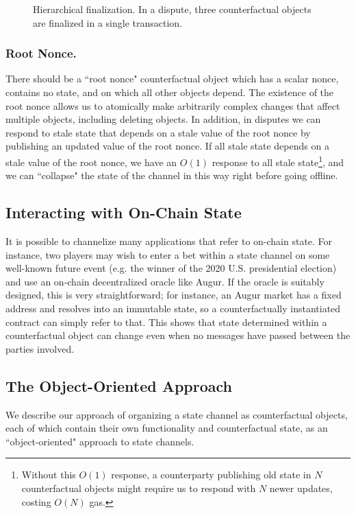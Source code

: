 \documentclass[prb,floatfix,reprint,nofootinbib,amsmath,amssymb,epsfig,pre,floats,letterpaper,groupedaffiliation,tightenlines,allcolors=blue,11pt]{revtex4}
\theoremstyle{definition}
\theoremstyle{definition}
\theoremstyle{definition}
\begin{document}
\begin{figure}[H]
    \centering
    
\caption{Hierarchical finalization. In a dispute, three counterfactual objects are finalized in a single transaction.}
\end{figure}

\subsubsection{Root Nonce.} There should be a ``root nonce" counterfactual object which has a scalar nonce, contains no state, and on which all other objects depend. The existence of the root nonce allows us to atomically make arbitrarily complex changes that affect multiple objects, including deleting objects. In addition, in disputes we can respond to stale state that depends on a stale value of the root nonce by publishing an updated value of the root nonce. If all stale state depends on a stale value of the root nonce, we have an $O(1)$ response to all stale state\footnote{Without this $O(1)$ response, a counterparty publishing old state in $N$ counterfactual objects might require us to respond with $N$ newer updates, costing $O(N)$ gas.}, and we can ``collapse" the state of the channel in this way right before going offline.

\subsection{Interacting with On-Chain State}

It is possible to channelize many applications that refer to on-chain state. For instance, two players may wish to enter a bet within a state channel on some well-known future event (e.g. the winner of the 2020 U.S. presidential election) and use an on-chain decentralized oracle like Augur. If the oracle is suitably designed, this is very straightforward; for instance, an Augur market has a fixed address and resolves into an immutable state, so a counterfactually instantiated contract can simply refer to that. This shows that state determined within a counterfactual object can change even when no messages have passed between the parties involved.

\subsection{The Object-Oriented Approach}

We describe our approach of organizing a state channel as counterfactual objects, each of which contain their own functionality and counterfactual state, as an ``object-oriented" approach to state channels.
\end{document}
